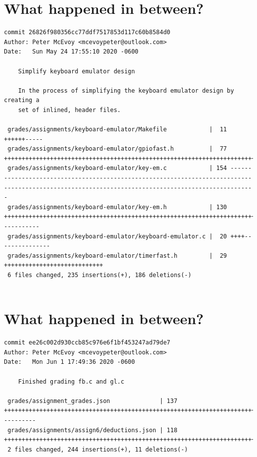 \documentclass{article}
\begin{document}
\newpage

\section*{What happened in between?}
\vspace{2ex}
\begin{verbatim}
commit 26826f980356cc77ddf7517853d117c60b8584d0
Author: Peter McEvoy <mcevoypeter@outlook.com>
Date:   Sun May 24 17:55:10 2020 -0600

    Simplify keyboard emulator design
    
    In the process of simplifying the keyboard emulator design by creating a
    set of inlined, header files.

 grades/assignments/keyboard-emulator/Makefile            |  11 ++++++-----
 grades/assignments/keyboard-emulator/gpiofast.h          |  77 ++++++++++++++++++++++++++++++++++++++++++++++++++++++++++++++++++++++++++
 grades/assignments/keyboard-emulator/key-em.c            | 154 ---------------------------------------------------------------------------------------------------------------------------------------------------
 grades/assignments/keyboard-emulator/key-em.h            | 130 +++++++++++++++++++++++++++++++++++++++++++++++++++++++++++++++++++++++++++++++++++++++++++++++++++++++++++++++++-----------
 grades/assignments/keyboard-emulator/keyboard-emulator.c |  20 ++++---------------
 grades/assignments/keyboard-emulator/timerfast.h         |  29 ++++++++++++++++++++++++++++
 6 files changed, 235 insertions(+), 186 deletions(-)


\end{verbatim}

\newpage

\section*{What happened in between?}
\vspace{2ex}
\begin{verbatim}
commit ee26c002d930ccb85c976e6f1bf453247ad79de7
Author: Peter McEvoy <mcevoypeter@outlook.com>
Date:   Mon Jun 1 17:49:36 2020 -0600

    Finished grading fb.c and gl.c

 grades/assignment_grades.json              | 137 +++++++++++++++++++++++++++++++++++++++++++++++++++++++++++++++++++++++++++++++++++++++++++++++++++++++++++++++++++++++++++++++----------
 grades/assignments/assign6/deductions.json | 118 +++++++++++++++++++++++++++++++++++++++++++++++++++++++++++++++++++++++++++++++++++++++++++++++++++++++++++++++++++++-
 2 files changed, 244 insertions(+), 11 deletions(-)


\end{verbatim}
\end{document}
